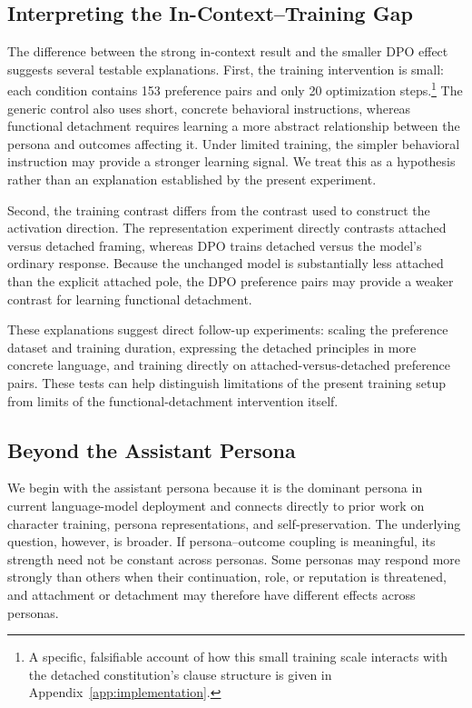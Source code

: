 \documentclass[10pt]{article}
\begin{document}
\subsection{Interpreting the In-Context–Training Gap}

The difference between the strong in-context result and the smaller DPO effect suggests several testable explanations. First, the training intervention is small: each condition contains 153 preference pairs and only 20 optimization steps.\footnote{A specific, falsifiable account of how this small training scale interacts with the detached constitution's clause structure is given in Appendix~\ref{app:implementation}.} The generic control also uses short, concrete behavioral instructions, whereas functional detachment requires learning a more abstract relationship between the persona and outcomes affecting it. Under limited training, the simpler behavioral instruction may provide a stronger learning signal. We treat this as a hypothesis rather than an explanation established by the present experiment.

Second, the training contrast differs from the contrast used to construct the activation direction. The representation experiment directly contrasts attached versus detached framing, whereas DPO trains detached versus the model's ordinary response. Because the unchanged model is substantially less attached than the explicit attached pole, the DPO preference pairs may provide a weaker contrast for learning functional detachment.

These explanations suggest direct follow-up experiments: scaling the preference dataset and training duration, expressing the detached principles in more concrete language, and training directly on attached-versus-detached preference pairs. These tests can help distinguish limitations of the present training setup from limits of the functional-detachment intervention itself.

\subsection{Beyond the Assistant Persona}

We begin with the assistant persona because it is the dominant persona in current language-model deployment and connects directly to prior work on character training, persona representations, and self-preservation. The underlying question, however, is broader. If persona–outcome coupling is meaningful, its strength need not be constant across personas. Some personas may respond more strongly than others when their continuation, role, or reputation is threatened, and attachment or detachment may therefore have different effects across personas.
\end{document}
